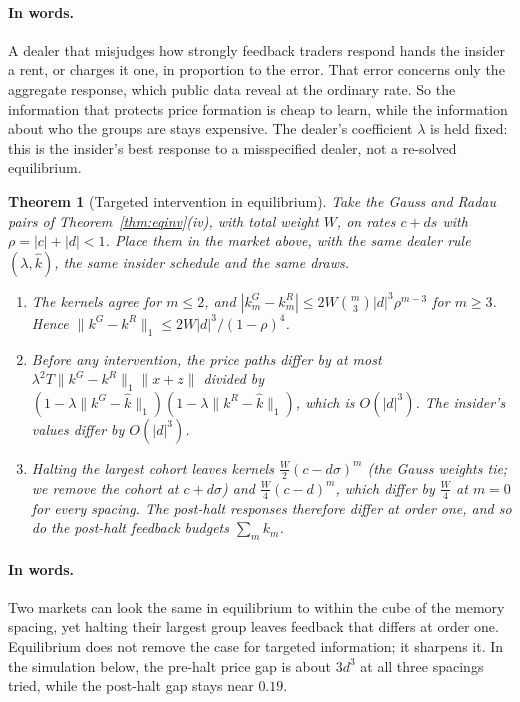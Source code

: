 \documentclass[12pt]{article}
\newtheorem{theorem}{Theorem}[section]
\theoremstyle{definition}
\theoremstyle{remark}
\begin{document}
\paragraph{In words.} A dealer that misjudges how strongly feedback traders respond hands the insider a rent, or charges it one, in proportion to the error. That error concerns only the aggregate response, which public data reveal at the ordinary rate. So the information that protects price formation is cheap to learn, while the information about who the groups are stays expensive. The dealer's coefficient $\lambda$ is held fixed: this is the insider's best response to a misspecified dealer, not a re-solved equilibrium.

\begin{theorem}[Targeted intervention in equilibrium]\label{thm:eqhalt}
Take the Gauss and Radau pairs of Theorem~\ref{thm:eqinv}(iv), with total weight $W$, on rates $c+ds$ with $\rho=|c|+|d|<1$. Place them in the market above, with the same dealer rule $(\lambda,\hat k)$, the same insider schedule and the same draws.
\begin{enumerate}[label=(\roman*),itemsep=1pt]
\item The kernels agree for $m\le2$, and $|k^G_m-k^R_m|\le2W\binom m3|d|^3\rho^{m-3}$ for $m\ge3$. Hence $\|k^G-k^R\|_1\le2W|d|^3/(1-\rho)^4$.
\item Before any intervention, the price paths differ by at most $\lambda^2T\|k^G-k^R\|_1\|x+z\|$ divided by $(1-\lambda\|k^G-\hat k\|_1)(1-\lambda\|k^R-\hat k\|_1)$, which is $O(|d|^3)$. The insider's values differ by $O(|d|^3)$.
\item Halting the largest cohort leaves kernels $\tfrac W2(c-d\sigma)^m$ (the Gauss weights tie; we remove the cohort at $c+d\sigma$) and $\tfrac W4(c-d)^m$, which differ by $\tfrac W4$ at $m=0$ for every spacing. The post-halt responses therefore differ at order one, and so do the post-halt feedback budgets $\sum_mk_m$.
\end{enumerate}
\end{theorem}

\paragraph{In words.} Two markets can look the same in equilibrium to within the cube of the memory spacing, yet halting their largest group leaves feedback that differs at order one. Equilibrium does not remove the case for targeted information; it sharpens it. In the simulation below, the pre-halt price gap is about $3d^3$ at all three spacings tried, while the post-halt gap stays near $0.19$.
\end{document}
